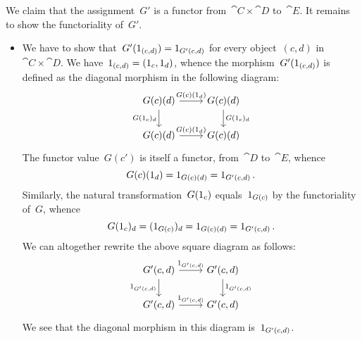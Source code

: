 We claim that the assignment~$G'$ is a functor from~$\cat{C} × \cat{D}$ to~$\cat{E}$.
It remains to show the functoriality of~$G'$.
\begin{itemize}

	\item
		We have to show that~$G'(1_{(c, d)}) = 1_{G'(c, d)}$ for every object~$(c, d)$ in~$\cat{C} × \cat{D}$.
		We have~$1_{(c, d)} = (1_c, 1_d)$, whence the morphism~$G'(1_{(c, d)})$ is defined as the diagonal morphism in the following diagram:
		\[
			\begin{tikzcd}
				G(c)(d)
				\arrow{r}[above]{G(c)(\id_d)}
				\arrow{d}[left]{G(\id_c)_d}
				&
				G(c)(d)
				\arrow{d}[right]{G(\id_c)_{d}}
				\\
				G(c)(d)
				\arrow{r}[above]{G(c)(\id_d)}
				&
				G(c)(d)
			\end{tikzcd}
		\]
		The functor value~$G(c')$ is itself a functor, from~$\cat{D}$ to~$\cat{E}$, whence
		\[
			G(c)(1_d) = 1_{G(c)(d)} = 1_{G'(c, d)} \,.
		\]
		Similarly, the natural transformation~$G(1_c)$ equals~$1_{G(c)}$ by the functoriality of~$G$, whence
		\[
			G(1_c)_d = (1_{G(c)})_d = 1_{G(c)(d)} = 1_{G'(c, d)} \,.
		\]
		We can altogether rewrite the above square diagram as follows:
		\[
			\begin{tikzcd}
				G'(c, d)
				\arrow{r}[above]{\id_{G'(c,d)}}
				\arrow{d}[left]{\id_{G'(c,d)}}
				&
				G'(c, d)
				\arrow{d}[right]{\id_{G'(c,d)}}
				\\
				G'(c, d)
				\arrow{r}[above]{\id_{G'(c,d)}}
				&
				G'(c, d)
			\end{tikzcd}
		\]
		We see that the diagonal morphism in this diagram is~$1_{G'(c, d)}$.


\end{itemize}
